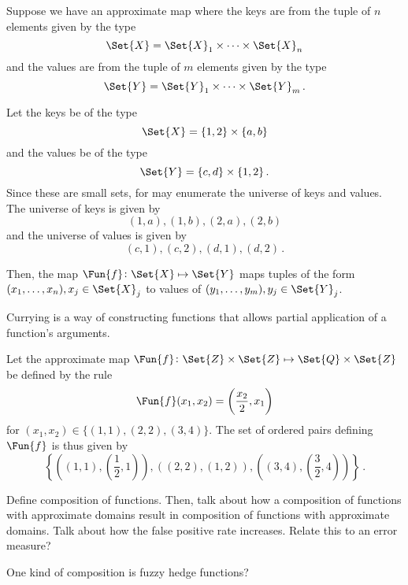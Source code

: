 \documentclass[ ../main.tex]{subfiles}
\begin{document}
Suppose we have an approximate map where the keys are from the tuple of $n$ elements given by the type
\begin{equation}
    \Set{X} = \Set{X}_1 \times \cdots \times \Set{X}_n
\end{equation}
and the values are from the tuple of $m$ elements given by the type
\begin{equation}
    \Set{Y} = \Set{Y}_1 \times \cdots \times \Set{Y}_m\,.
\end{equation}

\begin{example}
Let the keys be of the type
\begin{equation}
    \Set{X} = \{1,2\} \times \{a,b\}
\end{equation}
and the values be of the type
\begin{equation}
    \Set{Y} = \{c,d\} \times \{1,2\}\,.
\end{equation}
Since these are small sets, for may enumerate the universe of keys and values.
The universe of keys is given by
\begin{equation}
    (1,a),(1,b),(2,a),(2,b)
\end{equation}
and the universe of values is given by
\begin{equation}
    (c,1),(c,2),(d,1),(d,2)\,.
\end{equation}
\end{example}


Then, the map $\Fun{f} \colon \Set{X} \mapsto \Set{Y}$ maps tuples of the form $(x_1,\ldots,x_n), x_j \in \Set{X}_j$ to values of  $(y_1,\ldots,y_m),y_j \in \Set{Y}_j$.

Currying is a way of constructing functions that allows partial application of a function’s arguments.


\begin{example}
Let the approximate map $\Fun{f} \colon \Set{Z} \times \Set{Z} \mapsto \Set{Q} \times \Set{Z}$ be defined by the rule
\begin{equation}
    \Fun{f}(x_1,x_2) = \left(\frac{x_2}{2},x_1\right)
\end{equation}
for $(x_1,x_2) \in \{(1,1),(2,2),(3,4)\}$.
The set of ordered pairs defining $\Fun{f}$ is thus given by
\begin{equation}
    \left\{
        \left((1,1),\left(\frac{1}{2},1\right)\right),
        \left((2,2),\left(1,2\right)\right),
        \left((3,4),\left(\frac{3}{2},4\right)\right)
    \right\}\,.
\end{equation}
\end{example}

Define composition of functions. Then, talk about how a composition of functions with approximate domains result in composition of functions with approximate domains. Talk about how the false positive rate increases. Relate this to an error measure?


One kind of composition is fuzzy hedge functions?
\end{document}
